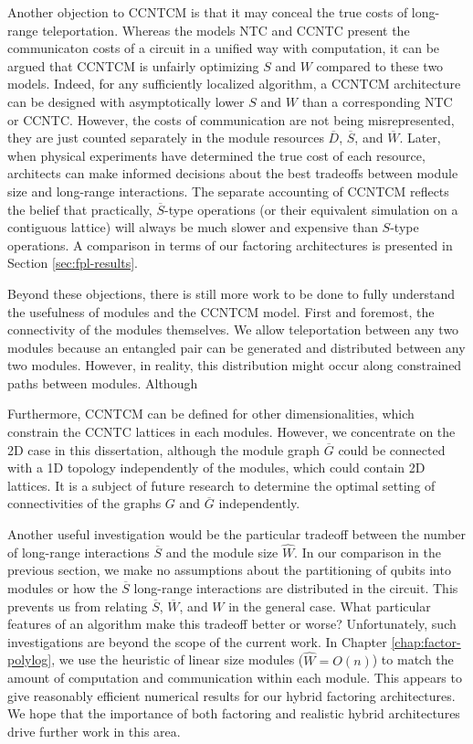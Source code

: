 Another objection to \textsf{CCNTCM} is that it may conceal the true
costs of long-range teleportation. Whereas the models \textsf{NTC} and
\textsf{CCNTC} present the communicaton costs of a circuit in a unified
way with computation, it can be argued that \textsf{CCNTCM} is unfairly
optimizing $S$ and $W$ compared to these two models. Indeed, for any
sufficiently localized algorithm, a \textsf{CCNTCM} architecture can be designed with asymptotically lower $S$ and $W$ than a corresponding \textsf{NTC} or \textsf{CCNTC}. However, the costs of communication are not being
misrepresented, they are just counted separately
in the module resources $\overline{D}$, $\overline{S}$, and
$\overline{W}$. Later, when physical experiments have determined the
true cost of each resource, architects can make informed decisions about
the best tradeoffs between module size and long-range interactions.
The separate accounting of \textsf{CCNTCM} reflects the belief that
practically, $\overline{S}$-type operations (or their equivalent simulation
on a contiguous lattice) will always be much slower
and expensive than $S$-type operations. A comparison in terms of our
factoring architectures is presented in Section \ref{sec:fpl-results}.

Beyond these objections, there is still more work to be done to fully
understand the usefulness of modules and the \textsf{CCNTCM} model.
First and foremost, the connectivity
of the modules themselves. We allow teleportation between any two modules
because an entangled pair can be generated and distributed between any
two modules. However, in reality, this distribution might occur along
constrained paths between modules. Although 

Furthermore, \textsf{CCNTCM} can be defined for other dimensionalities,
which constrain the \textsf{CCNTC} lattices in each modules.
However, we concentrate on the \textsf{2D} case in this dissertation,
although the module graph $\overline{G}$ could be connected with
a \textsc{1D} topology independently of the modules, which could contain
\textsc{2D} lattices. It is a subject of future research to determine
the optimal setting of connectivities of the graphs $G$
and $\overline{G}$ independently.

Another useful investigation would be
the particular tradeoff between the number of
long-range interactions $\overline{S}$ and the module size $\hat{W}$.
In our comparison in the previous section, we make no assumptions about the 
partitioning of qubits into
modules or how the $\overline{S}$ long-range interactions are distributed
in the circuit. This prevents us from relating $\overline{S}$,
$\overline{W}$, and $W$ in the general case.
What particular features of an algorithm make this tradeoff better or worse?
Unfortunately, such investigations are beyond the scope of the current
work. In Chapter \ref{chap:factor-polylog}, we use the heuristic of linear 
size modules ($\hat{W} = O(n)$) to match the amount of computation and
communication within each module. This appears to give reasonably efficient
numerical results for our hybrid factoring architectures. We hope that
the importance of
both factoring and realistic hybrid architectures drive further work in this
area.

